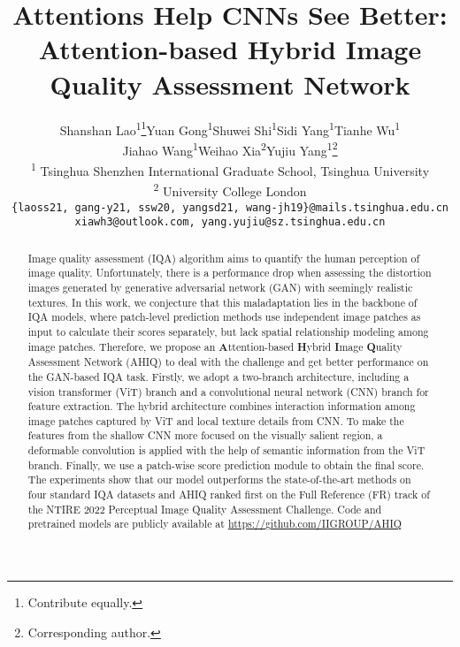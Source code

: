 \documentclass[10pt,twocolumn,letterpaper]{article}
\begin{document}
\title{Attentions Help CNNs See Better: Attention-based Hybrid Image Quality Assessment Network}

\author{Shanshan Lao\textsuperscript{1}\thanks{Contribute equally.}\quad Yuan Gong\textsuperscript{1}\footnotemark[1]\quad Shuwei Shi\textsuperscript{1}\quad  Sidi Yang\textsuperscript{1}\quad Tianhe Wu\textsuperscript{1}\quad \\Jiahao Wang\textsuperscript{1}\quad Weihao Xia\textsuperscript{2}\quad Yujiu Yang\textsuperscript{1}\thanks{Corresponding author.}\\
\textsuperscript{1} Tsinghua Shenzhen International Graduate School, Tsinghua University\\
\textsuperscript{2} University College London\\
{\tt\small \{laoss21,\ gang-y21,\ ssw20,\ yangsd21, wang-jh19\}@mails.tsinghua.edu.cn}\\
{\tt\small xiawh3@outlook.com, yang.yujiu@sz.tsinghua.edu.cn}
}
\maketitle



\begin{abstract}
Image quality assessment (IQA) algorithm aims to quantify the human perception of image quality.
Unfortunately, there is a performance drop when assessing the distortion images generated by generative adversarial network (GAN) with seemingly realistic textures. 
In this work, we conjecture that this maladaptation lies in the backbone of IQA models, where patch-level prediction methods use independent image patches as input to calculate their scores separately, but lack spatial relationship modeling among image patches. 
Therefore, we propose an \textbf{A}ttention-based \textbf{H}ybrid \textbf{I}mage \textbf{Q}uality Assessment Network (AHIQ) to deal with the challenge and get better performance on the GAN-based IQA task. 
Firstly, we adopt a two-branch architecture, including a vision transformer (ViT) branch and a convolutional neural network (CNN) branch for feature extraction. 
The hybrid architecture combines interaction information among image patches captured by ViT and local texture details from CNN. 
To make the features from the shallow CNN more focused on the visually salient region, a deformable convolution is applied with the help of semantic information from the ViT branch. 
Finally, we use a patch-wise score prediction module to obtain the final score. 
The experiments show that our model outperforms the state-of-the-art methods on four standard IQA datasets and AHIQ ranked first on the Full Reference (FR) track of the NTIRE 2022 Perceptual Image Quality Assessment Challenge.
Code and pretrained models are publicly available at \url{https://github.com/IIGROUP/AHIQ}
\end{abstract}
\end{document}
